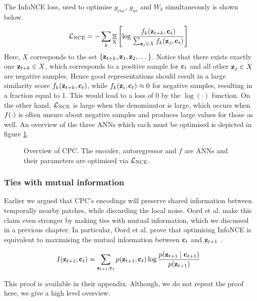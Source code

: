 	The InfoNCE loss, used to optimise $g_{enc}$, $g_{ar}$ and $W_k$ simultaneously is shown below. 
	\begin{equation} %
		\Lnce = - \sum_{k} \expected{\textsubscript{X}} \left[ \log \nceprediction \right] \label{eq:NCE_loss}
	\end{equation}
	Here, $X$ corresponds to the set ${ \left\{ \mathbf{z}_{t+k}, \mathbf{z}_1, \mathbf{z}_2, \dots \right\} }$. Notice that there exists exactly one $\mathbf{z}_{t+k} \in X$, which corresponds to a positive sample for $\mathbf{c}_t$ and all other $\mathbf{z}_j \in X$ are negative samples.  Hence good representations should result in a large similarity score $f_k(\mathbf{z}_{t+k}, \mathbf{c}_t)$, while $f_k(\mathbf{z}_i, \mathbf{c}_t) \approx 0$ for negative samples, resulting in a fraction equal to 1. This would lead to a loss of 0 by the $\log(\cdot)$ function. On the other hand, $\mathcal{L}_{\text{NCE}}$ is large when the denominator is large, which occurs when $f(\cdot)$ is often unsure about negative samples and produces large values for those as well. An overview of the three ANNs which each must be optimised is depicted in figure \ref{fig:cpc-my-overview}.
	

	\begin{figure}
		\hspace{2cm}
		\centering
		

		\caption{Overview of CPC. The encoder, autoregressor and $f$ are ANNs and their parameters are optimised via $\mathcal{L}_{\text{NCE}}$.}
		\label{fig:cpc-my-overview}
	\end{figure}
	
	
\subsubsection{Ties with mutual information} \label{cha:bg_cpc_ties_w_mi}
	Earlier we argued that CPC's encodings will preserve shared information between temporally nearby patches, while discarding the local noise. Oord et al. make this claim even stronger by making ties with mutual information, which we discussed in a previous chapter. In particular, Oord et al. prove that optimising InfoNCE is equivalent to maximising the mutual information between $\mathbf{c}_t$ and $\mathbf{z}_{t+1}$ \cite{oordRepresentationLearningContrastive2019}. 
	
	\begin{equation} %
		I(\ztone; \ct) = \sum_{\ztone, \ct} p(\ztone, \ct) \log \frac{p(\ztone \mid \ctone)}{p(\ztone)}
	\end{equation}
	
	This proof is available in their appendix. Although, we do not repeat the proof here, we give a high level overview.
	
